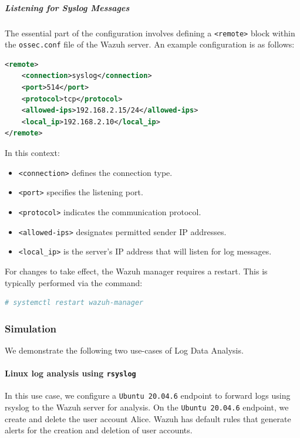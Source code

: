 \subparagraph{Listening for Syslog Messages}
The essential part of the configuration involves defining a \texttt{<remote>} block within the \texttt{ossec.conf} file of the Wazuh server. An example configuration is as follows:

\begin{lstlisting}[language=XML]
<remote>
    <connection>syslog</connection>
    <port>514</port>
    <protocol>tcp</protocol>
    <allowed-ips>192.168.2.15/24</allowed-ips>
    <local_ip>192.168.2.10</local_ip>
</remote>
\end{lstlisting}

In this context:
\begin{itemize}
    \item \texttt{<connection>} defines the connection type.
    \item \texttt{<port>} specifies the listening port.
    \item \texttt{<protocol>} indicates the communication protocol.
    \item \texttt{<allowed-ips>} designates permitted sender IP addresses.
    \item \texttt{<local\_ip>} is the server's IP address that will listen for log messages.
\end{itemize}

For changes to take effect, the Wazuh manager requires a restart. This is typically performed via the command:

\begin{lstlisting}[language=bash]
# systemctl restart wazuh-manager
\end{lstlisting}

\subsubsection{Simulation}
We demonstrate the following two use-cases of Log Data Analysis.
\paragraph{Linux log analysis using \texttt{rsyslog}}
In this use case, we configure a \texttt{Ubuntu 20.04.6} endpoint to forward logs using rsyslog to the Wazuh server for analysis. On the \texttt{Ubuntu 20.04.6} endpoint, we create and delete the user account Alice. Wazuh has default rules that generate alerts for the creation and deletion of user accounts.

